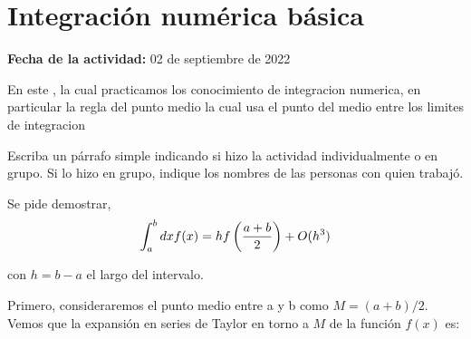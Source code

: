 \documentclass[../portafolio.tex]{subfiles}
\begin{document}


\section{Integración numérica básica}   %

\hfill \textbf{Fecha de la actividad:} 02 de septiembre de 2022

\medskip

En este , la cual practicamos los conocimiento de integracion numerica,
en particular la regla del punto medio la cual usa el punto del medio entre los limites de integracion

Escriba un párrafo simple indicando si hizo la actividad
individualmente o en grupo. Si lo hizo en grupo, indique los nombres
de las personas con quien trabajó.



Se pide demostrar, 
\begin{equation}
\int_{a}^{b} dx f(x) = h f\left(\frac{a+b}{2}\right) + O(h^3) \notag
\end{equation}

con $h=b-a$ el largo del intervalo.

\medskip

Primero, consideraremos el punto medio entre a y b como $M = (a+b)/2$. Vemos que la expansión en series de Taylor en torno a $M$ de la función $f(x)$ es:
\end{document}
